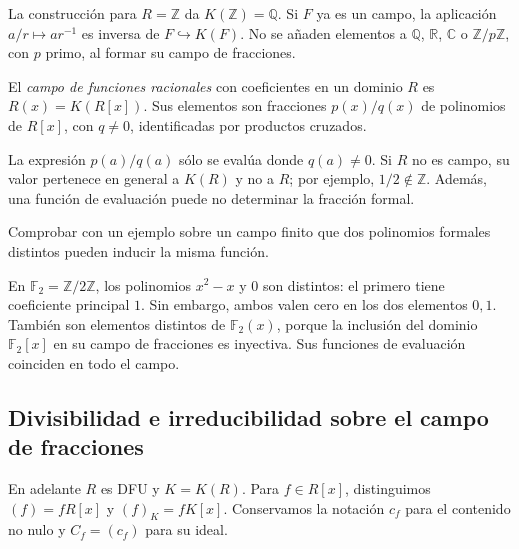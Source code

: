 \begin{ejem}
La construcción para $R=\mathbb Z$ da $K(\mathbb Z)=\mathbb Q$. Si $F$ ya es un campo, la aplicación $a/r\mapsto ar^{-1}$ es inversa de $F\hookrightarrow K(F)$. No se añaden elementos a $\mathbb Q$, $\mathbb R$, $\mathbb C$ o $\mathbb Z/p\mathbb Z$, con $p$ primo, al formar su campo de fracciones.
\end{ejem}
\begin{defi}
El \emph{campo de funciones racionales} con coeficientes en un dominio $R$ es $R(x)=K(R[x])$. Sus elementos son fracciones $p(x)/q(x)$ de polinomios de $R[x]$, con $q\ne0$, identificadas por productos cruzados.
\end{defi}
\begin{obs}
La expresión $p(a)/q(a)$ sólo se evalúa donde $q(a)\ne0$. Si $R$ no es campo, su valor pertenece en general a $K(R)$ y no a $R$; por ejemplo, $1/2\notin\mathbb Z$. Además, una función de evaluación puede no determinar la fracción formal.
\end{obs}

\begin{ejer}\label{ejer:C18-formal-funcion}
Comprobar con un ejemplo sobre un campo finito que dos polinomios formales distintos pueden inducir la misma función.
\end{ejer}
\begin{sol}
En $\mathbb F_2=\mathbb Z/2\mathbb Z$, los polinomios $x^2-x$ y $0$ son distintos: el primero tiene coeficiente principal $1$. Sin embargo, ambos valen cero en los dos elementos $0,1$. También son elementos distintos de $\mathbb F_2(x)$, porque la inclusión del dominio $\mathbb F_2[x]$ en su campo de fracciones es inyectiva. Sus funciones de evaluación coinciden en todo el campo.
\end{sol}

\subsection{Divisibilidad e irreducibilidad sobre el campo de fracciones}\label{tema:18-2-1}\label{tema:18-2-2}
En adelante $R$ es DFU y $K=K(R)$. Para $f\in R[x]$, distinguimos $(f)=fR[x]$ y $(f)_K=fK[x]$. Conservamos la notación $c_f$ para el contenido no nulo y $C_f=(c_f)$ para su ideal.

